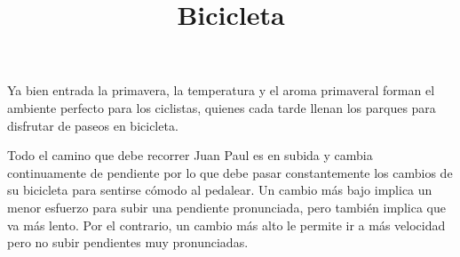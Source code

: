 \documentclass{oci}
\title{Bicicleta}
\begin{document}
\begin{problemDescription}
Ya bien entrada la primavera, la temperatura y el aroma primaveral forman el
ambiente perfecto para los ciclistas, quienes cada tarde llenan los parques para
disfrutar de paseos en bicicleta.



Todo el camino que debe recorrer Juan Paul es en subida y cambia continuamente
de pendiente por lo que debe pasar constantemente los cambios de su bicicleta para sentirse
cómodo al pedalear. 
Un cambio más bajo implica un menor esfuerzo para subir una pendiente pronunciada, 
pero también implica que va más lento.
Por el contrario, un cambio más alto le permite ir a más velocidad pero no subir
pendientes muy pronunciadas. 






\end{problemDescription}
\end{document}
